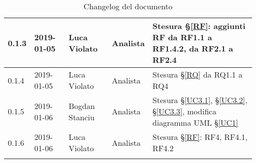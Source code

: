\begin{center}
\begin{longtable}[c]{|m{}|m{}|m{}|m{}|p{}|}
\hline
0.1.3 & 2019-01-05 & Luca Violato & Analista & Stesura §\ref{RF}: aggiunti RF da RF1.1 a RF1.4.2, da RF2.1 a RF2.4\\
\hline
\rowcolor{grigio}0.1.4 & 2019-01-05 & Luca Violato & Analista & Stesura §\ref{RQ} da RQ1.1 a RQ4\\
\hline
0.1.5 & 2019-01-06 & Bogdan Stanciu & Analista & Stesura §\ref{UC3.1}, §\ref{UC3.2}, §\ref{UC3.3}, modifica diagramma UML §\ref{UC1} \\
\hline
\rowcolor{grigio}0.1.6 & 2019-01-06 & Luca Violato & Analista & Stesura §\ref{RF}: RF4, RF4.1, RF4.2\\
\hline
\caption{Changelog del documento}
\end{longtable}
\end{center}